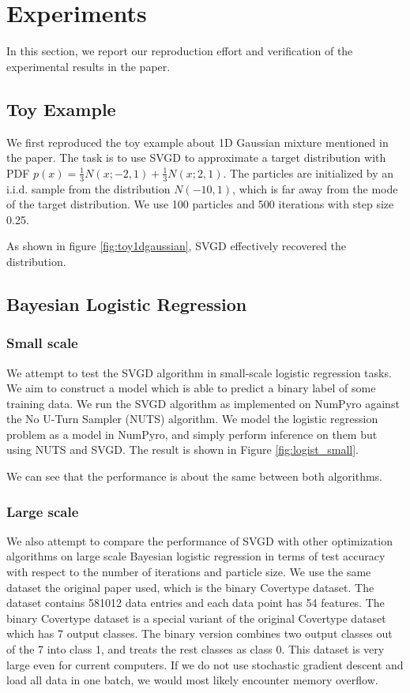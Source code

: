\section{Experiments}
In this section, we report our reproduction effort and verification of the experimental results in the paper.

\subsection{Toy Example}


We first reproduced the toy example about 1D Gaussian mixture mentioned in the paper. The task is to use SVGD to approximate a target distribution with PDF $p(x) = \frac{1}{3} N(x; -2, 1) + \frac{1}{3} N(x; 2, 1)$. The particles are initialized by an i.i.d. sample from the distribution $N(-10, 1)$, which is far away from the mode of the target distribution. We use 100 particles and 500 iterations with step size 0.25. 

As shown in figure \ref{fig:toy1dgaussian}, SVGD effectively recovered the distribution.





\subsection{Bayesian Logistic Regression}
\subsubsection{Small scale}
We attempt to test the SVGD algorithm in small-scale logistic regression tasks. We aim to construct a model which is able to predict a binary label of some training data. We run the SVGD algorithm as implemented on NumPyro against the No U-Turn Sampler (NUTS) algorithm. We model the logistic regression problem as a model in NumPyro, and simply perform inference on them but using NUTS and SVGD. The result is shown in Figure \ref{fig:logist_small}.

We can see that the performance is about the same between both algorithms.

\subsubsection{Large scale}
We also attempt to compare the performance of SVGD with other optimization algorithms on large scale Bayesian logistic regression in terms of test accuracy with respect to the number of iterations and particle size. We use the same dataset the original paper used, which is the binary Covertype dataset. The dataset contains 581012 data entries and each data point has 54 features. The binary Covertype dataset is a special variant of the original Covertype dataset which has 7 output classes. The binary version combines two output classes out of the 7 into class 1, and treats the rest classes as class 0. This dataset is very large even for current computers. If we do not use stochastic gradient descent and load all data in one batch, we would most likely encounter memory overflow. 

